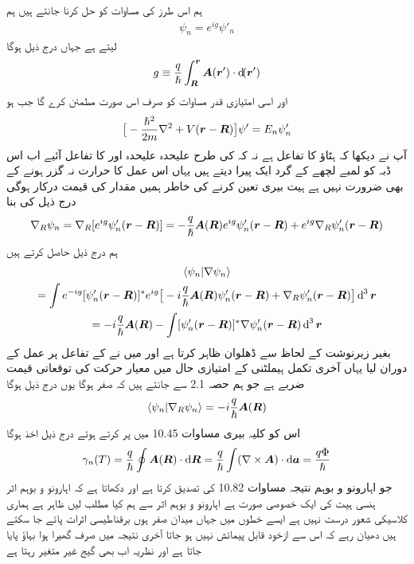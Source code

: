 ہم اس طرز کی مساوات کو حل کرنا جانتے ہیں ہم
\begin{align}
\psi_n = e^{i g} \psi'_n
\end{align}
لیتے ہے جہاں درج ذیل ہوگا 
\begin{align}
g \equiv \frac{q}{\hslash} \int_{\kvec{R}}^{\kvec{r}} \kvec{A} (\kvec{r}') \cdot \dif (\kvec{r}')
\end{align}
اور  اسی امتیازی قدر مساوات کو صرف اس صورت مطمئن کرے گا جب  ہو 
\begin{align}
\big [ - \frac{\hslash^2}{2m} \nabla^2 + V ({{\boldsymbol{r}}} - {{\boldsymbol{R}}}) \big ] \psi' = E_n \psi'_n
\end{align}
آپ نے دیکھا کہ  ہٹاؤ  کا تفاعل ہے نہ کہ  کی طرح علیحدہ علیحدہ  اور  کا تفاعل آئیے اب اس ڈبہ کو لمبے لچھے کے گرد ایک پیرا دیتے ہیں یہاں اس عمل کا حرارت نہ گزر ہونے کے بھی ضرورت نہیں ہے ہیت بیری تعین کرنے کی خاطر ہمیں مقدار  کی قیمت درکار ہوگی درج ذیل کی بنا 
\begin{align*}
\nabla_R \psi_n = \nabla_R [e^{i g} \psi'_n ({{\boldsymbol{r}}} - {{\boldsymbol{R}}})] = - \frac{q}{\hslash} {{\boldsymbol{A}}} ({{\boldsymbol{R}}}) e^{i g} \psi'_n ({{\boldsymbol{r}}} - {{\boldsymbol{R}}}) + e^{i g} \nabla_R \psi'_n ({{\boldsymbol{r}}} - {{\boldsymbol{R}}})
\end{align*}
ہم درج ذیل حاصل کرتے ہیں 
\begin{multline}
\langle \psi_n | \nabla \psi_n \rangle \\
= \int e^{- i g} [\psi'_n (\kvec{r} - \kvec{R})]^{*} e^{i g} \big [ - i \frac{q}{\hslash} \kvec{A} (\kvec{R}) \psi'_n (\kvec{r} - \kvec{R}) + \nabla_R \psi'_n (\kvec{r} - \kvec{R}) \big ] \dif^{\,3} \kvec{r} \\
= - i \frac{q}{\hslash} \kvec{A} (\kvec{R}) - \int [\psi'_n (\kvec{r} - \kvec{R})]^{*} \nabla \psi'_n (\kvec{r} - \kvec{R}) \dif^{\,3} \kvec{r}
\end{multline}
بغیر زیرنوشت   کے لحاظ سے ڈھلوان ظاہر کرتا ہے اور میں نے  کے تفاعل پر عمل کے دوران  لیا یہاں آخری تکمل ہیملٹنی  کے امتیازی حال میں معیار حرکت کی توقعاتی قیمت ضربے  ہے جو ہم حصہ 2.1 سے جانتے ہیں کہ صفر ہوگا یوں درج ذیل ہوگا 
\begin{align}
\langle \psi_n | \nabla_R \psi_n \rangle = - i \frac{q}{\hslash} {{\boldsymbol{A}}} ({{\boldsymbol{R}}})
\end{align}
اس کو کلیہ بیری مساوات 10.45 میں پر کرتے ہوئے درج ذیل اخذ ہوگا 
\begin{align}
\gamma_n (T) = \frac{q}{\hslash} \oint \kvec{A} (\kvec{R}) \cdot \dif \kvec{R} = \frac{q}{\hslash} \int (\nabla \times \kvec{A}) \cdot \dif \kvec{a} = \frac{q \Phi}{\hslash}
\end{align}
جو اہارونو و بوہم نتیجہ مساوات 10.82 کی تصدیق کرتا ہے اور دکھاتا ہے کہ اہارونو و بوہم اثر ہنسی ہیت کی ایک خصوصی صورت ہے اہارونو و بوہم اثر سے ہم کیا مطلب ليں ظاہر ہے ہماری کلاسیکی شعور درست نہیں ہے ایسے خطوں میں جہاں میدان صفر ہوں برقناطیسی اثرات پائے جا سکتے ہیں دھیان رہے کہ اس سے  ازخود قابل پیمائش نہیں ہو جاتا آخری نتیجہ میں صرف گھیرا ہوا بہاؤ پایا جاتا ہے اور نظریہ اب بھی گیج غیر متغیر رہتا ہے 


